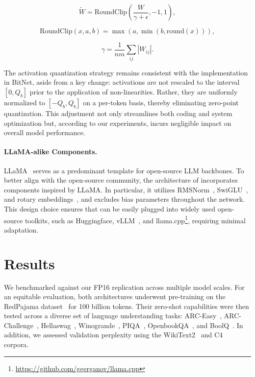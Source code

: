 \begin{equation}
    \widetilde{W} = \mathrm{RoundClip}(\frac{W}{\gamma + \epsilon}, -1, 1),
\end{equation}

\begin{equation}
    \mathrm{RoundClip}(x, a, b) = \max(a, \min(b, \mathrm{round}(x))),
\end{equation}

\begin{equation}
    \gamma = \frac{1}{nm}\sum_{ij} |W_{ij}|.
\end{equation}

The activation quantization strategy remains consistent with the implementation in BitNet, aside from a key change: activations are not rescaled to the interval $[0, Q_b]$ prior to the application of non-linearities. Rather, they are uniformly normalized to $[-Q_b, Q_b]$ on a per-token basis, thereby eliminating zero-point quantization. This adjustment not only streamlines both coding and system optimization but, according to our experiments, incurs negligible impact on overall model performance.

\paragraph{LLaMA-alike Components.}

LLaMA~\cite{llama, llama2} serves as a predominant template for open-source LLM backbones. To better align with the open-source community, the architecture of  incorporates components inspired by LLaMA. In particular, it utilizes RMSNorm~\cite{rmsnorm}, SwiGLU~\cite{swiglu}, and rotary embeddings~\cite{rope}, and excludes bias parameters throughout the network. This design choice ensures that  can be easily plugged into widely used open-source toolkits, such as Huggingface, vLLM~\cite{vllm}, and llama.cpp\footnote{\url{https://github.com/ggerganov/llama.cpp}}, requiring minimal adaptation.

\section{Results}

We benchmarked  against our FP16  replication across multiple model scales. For an equitable evaluation, both architectures underwent pre-training on the RedPajama dataset~\cite{redpajama} for 100 billion tokens. Their zero-shot capabilities were then tested across a diverse set of language understanding tasks: ARC-Easy~\cite{arc}, ARC-Challenge~\cite{arc}, Hellaswag~\cite{hellaswag}, Winogrande~\cite{winoGrande}, PIQA~\cite{piqa}, OpenbookQA~\cite{openbookqa}, and BoolQ~\cite{boolq}. In addition, we assessed validation perplexity using the WikiText2~\cite{wikitext2} and C4~\cite{c4} corpora.

